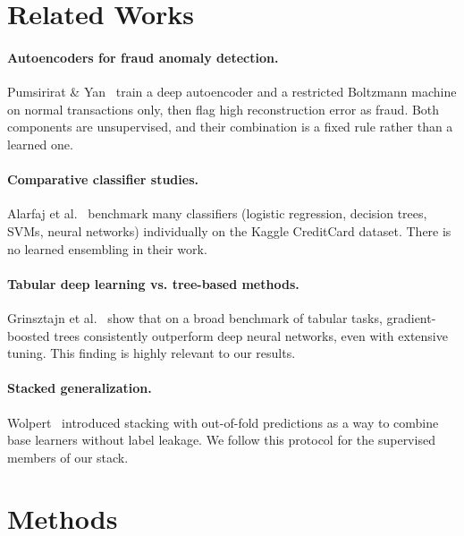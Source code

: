 \documentclass[11pt]{article}
\begin{document}
\section{Related Works}

\paragraph{Autoencoders for fraud anomaly detection.}
Pumsirirat \& Yan~\cite{pumsirirat2018} train a deep autoencoder and a restricted Boltzmann machine on normal transactions only, then flag high reconstruction error as fraud. Both components are unsupervised, and their combination is a fixed rule rather than a learned one.

\paragraph{Comparative classifier studies.}
Alarfaj et al.~\cite{alarfaj2022} benchmark many classifiers (logistic regression, decision trees, SVMs, neural networks) individually on the Kaggle CreditCard dataset. There is no learned ensembling in their work.

\paragraph{Tabular deep learning vs. tree-based methods.}
Grinsztajn et al.~\cite{grinsztajn2022} show that on a broad benchmark of tabular tasks, gradient-boosted trees consistently outperform deep neural networks, even with extensive tuning. This finding is highly relevant to our results.

\paragraph{Stacked generalization.}
Wolpert~\cite{wolpert1992stacking} introduced stacking with out-of-fold predictions as a way to combine base learners without label leakage. We follow this protocol for the supervised members of our stack.

\section{Methods}
\end{document}
